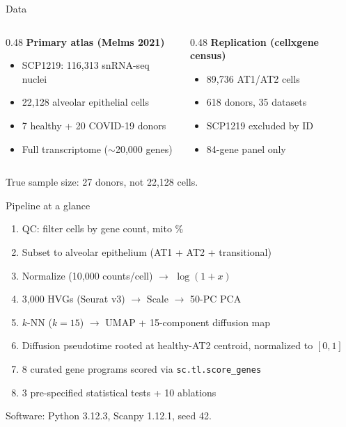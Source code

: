 \documentclass[aspectratio=169]{beamer}
\begin{document}
\begin{frame}{Data}
\begin{columns}[T]
\begin{column}{0.48\textwidth}
\textbf{Primary atlas (Melms 2021)}
\begin{itemize}
  \item SCP1219: 116{,}313 snRNA-seq nuclei
  \item 22{,}128 alveolar epithelial cells
  \item 7 healthy + 20 COVID-19 donors
  \item Full transcriptome ($\sim$20{,}000 genes)
\end{itemize}
\end{column}
\begin{column}{0.48\textwidth}
\textbf{Replication (cellxgene census)}
\begin{itemize}
  \item 89{,}736 AT1/AT2 cells
  \item 618 donors, 35 datasets
  \item SCP1219 \alert{excluded by ID}
  \item 84-gene panel only
\end{itemize}
\end{column}
\end{columns}
\vspace{0.8em}
\alert{True sample size: 27 donors, not 22{,}128 cells.}
\end{frame}

\begin{frame}{Pipeline at a glance}
\small
\begin{enumerate}
  \item QC: filter cells by gene count, mito \%
  \item Subset to alveolar epithelium (AT1 + AT2 + transitional)
  \item Normalize (10{,}000 counts/cell) $\to$ $\log(1+x)$
  \item 3{,}000 HVGs (Seurat v3) $\to$ Scale $\to$ 50-PC PCA
  \item $k$-NN ($k{=}15$) $\to$ UMAP + 15-component diffusion map
  \item Diffusion pseudotime rooted at healthy-AT2 centroid, normalized to $[0,1]$
  \item 8 curated gene programs scored via \texttt{sc.tl.score\_genes}
  \item 3 pre-specified statistical tests + 10 ablations
\end{enumerate}
\normalsize
Software: Python 3.12.3, Scanpy 1.12.1, seed 42.
\end{frame}
\end{document}
